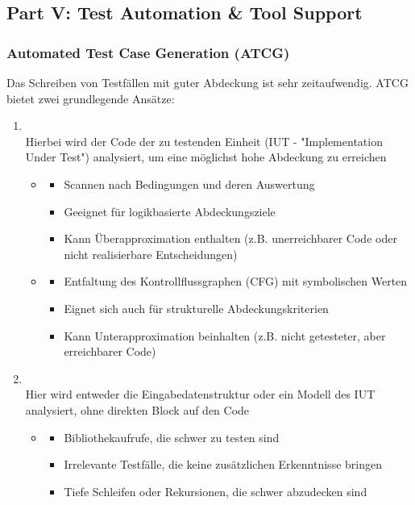 \subsection{Part V: Test Automation \& Tool Support}
\subsubsection*{Automated Test Case Generation (ATCG)}
\begin{infoBox}
    Das Schreiben von Testfällen mit guter Abdeckung ist sehr zeitaufwendig. ATCG bietet zwei grundlegende Ansätze:
    \begin{enumerate}
        \item {}\\
        Hierbei wird der Code der zu testenden Einheit (IUT - "Implementation Under Test") analysiert, um eine möglichst hohe Abdeckung zu erreichen
        \begin{itemize}
            \item {}
            \begin{itemize}
                \item Scannen nach Bedingungen und deren Auswertung
                \item Geeignet für logikbasierte Abdeckungsziele
                \item Kann Überapproximation enthalten (z.B. unerreichbarer Code oder nicht realisierbare Entscheidungen)
            \end{itemize}
            \item {}
            \begin{itemize}
                \item Entfaltung des Kontrollflussgraphen (CFG) mit symbolischen Werten
                \item Eignet sich auch für strukturelle Abdeckungskriterien
                \item Kann Unterapproximation beinhalten (z.B. nicht getesteter, aber erreichbarer Code)
            \end{itemize}
        \end{itemize}
        \item {}\\
        Hier wird entweder die Eingabedatenstruktur oder ein Modell des IUT analysiert, ohne direkten Block auf den Code
        \begin{itemize}
            \item {}
            \begin{itemize}
                \item Bibliothekaufrufe, die schwer zu testen sind
                \item Irrelevante Testfälle, die keine zusätzlichen Erkenntnisse bringen
                \item Tiefe Schleifen oder Rekursionen, die schwer abzudecken sind
            \end{itemize}
        \end{itemize}
    \end{enumerate}
\end{infoBox}
